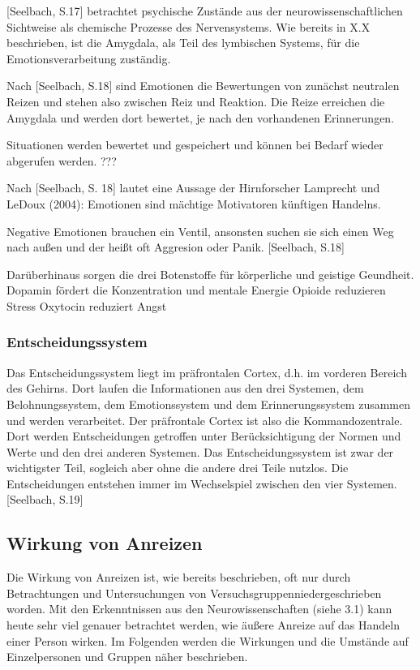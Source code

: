 [Seelbach, S.17] betrachtet psychische Zustände aus der neurowissenschaftlichen Sichtweise als chemische Prozesse des Nervensystems.
Wie bereits in X.X beschrieben, ist die Amygdala, als Teil des lymbischen Systems, für die Emotionsverarbeitung zuständig. 

Nach [Seelbach, S.18] sind Emotionen die Bewertungen von zunächst neutralen Reizen und stehen also zwischen Reiz und Reaktion. Die Reize erreichen die Amygdala und werden dort bewertet, je nach den vorhandenen Erinnerungen. 

Situationen werden bewertet und gespeichert und können bei Bedarf wieder abgerufen werden. ???

Nach [Seelbach, S. 18] lautet eine Aussage der Hirnforscher Lamprecht und LeDoux (2004):  \glqq Emotionen sind mächtige Motivatoren künftigen Handelns.\grqq

Negative Emotionen brauchen ein Ventil, ansonsten suchen sie sich einen Weg nach außen und der heißt oft Aggresion oder Panik. [Seelbach, S.18]

Darüberhinaus sorgen die drei Botenstoffe für körperliche und geistige Geundheit. 
Dopamin fördert die Konzentration und mentale Energie
Opioide reduzieren Stress
Oxytocin reduziert Angst


\subsubsection{Entscheidungssystem}
Das Entscheidungssystem liegt im präfrontalen Cortex, d.h. im vorderen Bereich des Gehirns. Dort laufen die Informationen aus den drei Systemen, dem Belohnungssystem, dem Emotionssystem und dem Erinnerungssystem zusammen und werden verarbeitet. Der präfrontale Cortex ist also die Kommandozentrale. Dort werden Entscheidungen getroffen unter Berücksichtigung der Normen und Werte und den drei anderen Systemen. Das Entscheidungssystem ist zwar der wichtigster Teil, sogleich aber ohne die andere drei Teile nutzlos. Die Entscheidungen entstehen immer im Wechselspiel zwischen den vier Systemen. [Seelbach, S.19]

\subsection{Wirkung von Anreizen}
Die Wirkung von Anreizen ist, wie bereits beschrieben, oft nur durch Betrachtungen und Untersuchungen von \glqq Versuchsgruppen\grqq niedergeschrieben worden. Mit den Erkenntnissen aus den Neurowissenschaften (siehe 3.1) kann heute sehr viel genauer betrachtet werden, wie äußere Anreize auf das Handeln einer Person wirken. Im Folgenden werden die Wirkungen und die Umstände auf Einzelpersonen und Gruppen näher beschrieben.


